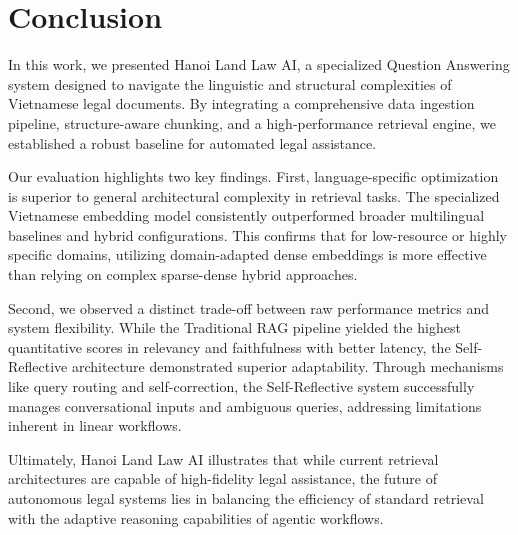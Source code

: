 \documentclass[letterpaper]{article} %
\begin{document}
\section{Conclusion}

In this work, we presented Hanoi Land Law AI, a specialized Question Answering system designed to navigate the linguistic and structural complexities of Vietnamese legal documents. By integrating a comprehensive data ingestion pipeline, structure-aware chunking, and a high-performance retrieval engine, we established a robust baseline for automated legal assistance.

Our evaluation highlights two key findings. First, language-specific optimization is superior to general architectural complexity in retrieval tasks. The specialized Vietnamese embedding model consistently outperformed broader multilingual baselines and hybrid configurations. This confirms that for low-resource or highly specific domains, utilizing domain-adapted dense embeddings is more effective than relying on complex sparse-dense hybrid approaches.

Second, we observed a distinct trade-off between raw performance metrics and system flexibility. While the Traditional RAG pipeline yielded the highest quantitative scores in relevancy and faithfulness with better latency, the Self-Reflective architecture demonstrated superior adaptability. Through mechanisms like query routing and self-correction, the Self-Reflective system successfully manages conversational inputs and ambiguous queries, addressing limitations inherent in linear workflows.

Ultimately, Hanoi Land Law AI illustrates that while current retrieval architectures are capable of high-fidelity legal assistance, the future of autonomous legal systems lies in balancing the efficiency of standard retrieval with the adaptive reasoning capabilities of agentic workflows.



\end{document}
